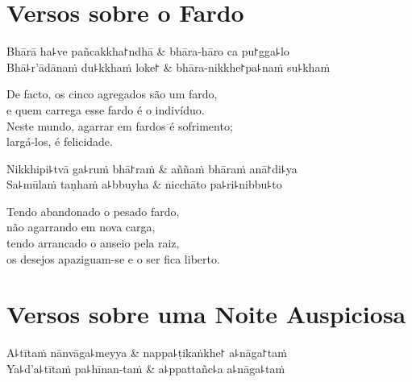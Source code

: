 \chapter{Versos sobre o Fardo}


\begin{leader}
\end{leader}

\begin{twochants}
Bhārā ha꜕ve pañcakkha꜓ndhā & bhāra-hāro ca pu꜓gga꜕lo \\
Bhā꜕r'ādānaṁ du꜕kkhaṁ loke꜓ & bhāra-nikkhe꜓pa꜕naṁ su꜕khaṁ \\
\end{twochants}

\begin{english}
  De facto, os cinco agregados são um fardo,\\
  e quem carrega esse fardo é o indivíduo.\\
  Neste mundo, agarrar em fardos é sofrimento;\\
  largá-los, é felicidade.
\end{english}

\begin{twochants}
Nikkhipi꜕tvā ga꜕ruṁ bhā꜓raṁ & aññaṁ bhāraṁ anā꜓di꜕ya \\
Sa꜕mūlaṁ taṇhaṁ a꜕bbuyha & nicchāto pa꜕ri꜕nibbu꜕to \\
\end{twochants}

\begin{english}
  Tendo abandonado o pesado fardo,\\
  não agarrando em nova carga,\\
  tendo arrancado o anseio pela raiz,\\
  os desejos apaziguam-se e o ser fica liberto.
\end{english}

\chapter{Versos sobre uma Noite Auspiciosa}


\begin{leader}
\end{leader}

\begin{twochants}
  A꜕tītaṁ nānvāga꜕meyya & nappa꜕ṭikaṅkhe꜓ a꜕nāga꜓taṁ \\
  Ya꜕d'a꜕tītaṁ pa꜕hīnan-taṁ & a꜕ppattañc꜕a a꜕nāga꜕taṁ \\
\end{twochants}

